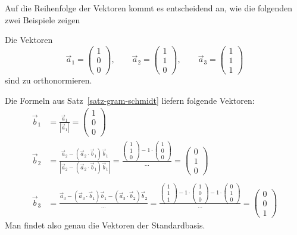 Auf die Reihenfolge der Vektoren kommt es entscheidend an, wie die
folgenden zwei Beispiele zeigen
\begin{beispiel}
Die Vektoren
\[
\vec a_1=\begin{pmatrix}1\\0\\0\end{pmatrix},\qquad
\vec a_2=\begin{pmatrix}1\\1\\0\end{pmatrix},\qquad
\vec a_3=\begin{pmatrix}1\\1\\1\end{pmatrix}
\]
sind zu orthonormieren.

Die Formeln aus Satz~\ref{satz-gram-schmidt} liefern folgende Vektoren:
\begin{align*}
\vec b_1&=\frac{\vec a_1}{|\vec a_1|}=\begin{pmatrix}1\\0\\0\end{pmatrix}\\
\vec b_2&=
\frac{
\vec a_2-(\vec a_2\cdot \vec b_1)\vec b_1
}{
|\vec a_2-(\vec a_2\cdot \vec b_1)\vec b_1|
}
=
\frac{
\begin{pmatrix}1\\1\\0\end{pmatrix}-1\cdot\begin{pmatrix}1\\0\\0\end{pmatrix}
}{\dots}=\begin{pmatrix}0\\1\\0\end{pmatrix}\\
\\
\vec b_3&=
\frac{\vec a_3 -(\vec a_3\cdot \vec b_1)\vec b_1-(\vec a_3\cdot\vec b_2)\vec b_2}{\dots}
=\frac{\begin{pmatrix}1\\1\\1\end{pmatrix}-1\cdot \begin{pmatrix}1\\0\\0\end{pmatrix}-1\cdot\begin{pmatrix}0\\1\\0\end{pmatrix}
}{\dots}=\begin{pmatrix}0\\0\\1\end{pmatrix}
\end{align*}
Man findet also genau die Vektoren der Standardbasis.
\end{beispiel}

